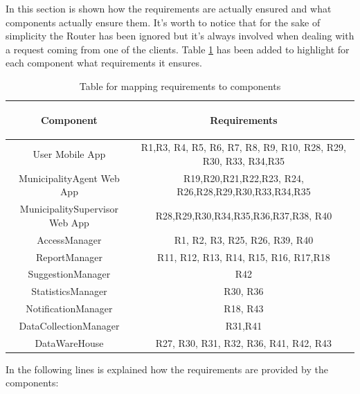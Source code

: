 \documentclass[a4paper]{report}
\begin{document}
In this section is shown how the requirements are actually ensured and what components actually ensure them. It's worth to notice that for the sake of simplicity the Router has been ignored but it's always involved when dealing with a request coming from one of the clients. 
Table \ref{tab:req-trace} has been added to highlight for each component what requirements it ensures.
\begin{table}[H]  
  \centering
  \begin{tabular}{|c|c|}
    \cline{1-2}
   	\rule{0pt}{10pt} 
   	\begin{large}
    \textbf{Component} 
    \end{large}&\begin{large}
    \textbf{Requirements} 
    \end{large}\\  \hline
    User Mobile App &  R1,R3, R4, R5, R6, R7, R8, R9, R10, R28, R29, R30, R33, R34,R35\\ \hline
    MunicipalityAgent Web App & R19,R20,R21,R22,R23, R24, R26,R28,R29,R30,R33,R34,R35 \\ \hline
    MunicipalitySupervisor Web App & R28,R29,R30,R34,R35,R36,R37,R38, R40 \\ \hline
    AccessManager & R1, R2, R3, R25, R26, R39, R40 \\ \hline
    ReportManager & R11, R12, R13, R14, R15, R16, R17,R18\\ \hline
    SuggestionManager & R42 \\ \hline
    StatisticsManager & R30, R36 \\ \hline
    NotificationManager & R18, R43 \\ \hline
    DataCollectionManager & R31,R41 \\ \hline
    DataWareHouse & R27, R30, R31, R32, R36, R41, R42, R43 \\ \hline
    
  \end{tabular}
  \caption{Table for mapping requirements to components} \label{tab:req-trace}
\end{table}
In the following lines is explained how the requirements are provided by the components:
\end{document}
